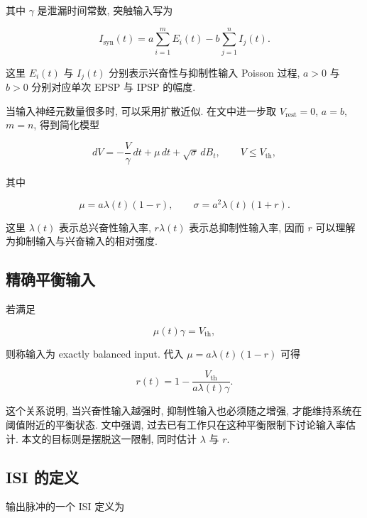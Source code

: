 \documentclass[oneside]{ctexart}
\begin{document}
其中 $\gamma$ 是泄漏时间常数, 突触输入写为

\begin{equation}
    I_{\mathrm{syn}}(t)=a\sum\limits_{i=1}^{m}E_i(t)-b\sum\limits_{j=1}^{n}I_j(t).
\end{equation}

这里 $E_i(t)$ 与 $I_j(t)$ 分别表示兴奋性与抑制性输入 Poisson 过程, $a>0$ 与 $b>0$ 分别对应单次 EPSP 与 IPSP 的幅度.

当输入神经元数量很多时, 可以采用扩散近似. 在文中进一步取 $V_{\mathrm{rest}}=0$, $a=b$, $m=n$, 得到简化模型

\begin{equation}
    dV=-\dfrac{V}{\gamma}\,dt+\mu\,dt+\sqrt{\sigma}\,dB_t, \qquad V\leq V_{\mathrm{th}},
\end{equation}

其中

\begin{equation}
    \mu=a\lambda(t)(1-r), \qquad \sigma=a^2\lambda(t)(1+r).
\end{equation}

这里 $\lambda(t)$ 表示总兴奋性输入率, $r\lambda(t)$ 表示总抑制性输入率, 因而 $r$ 可以理解为抑制输入与兴奋输入的相对强度.

\subsection{精确平衡输入}

若满足

\begin{equation}
    \mu(t)\gamma=V_{\mathrm{th}},
\end{equation}

则称输入为 exactly balanced input. 代入 $\mu=a\lambda(t)(1-r)$ 可得

\begin{equation}
    r(t)=1-\dfrac{V_{\mathrm{th}}}{a\lambda(t)\gamma}.
\end{equation}

这个关系说明, 当兴奋性输入越强时, 抑制性输入也必须随之增强, 才能维持系统在阈值附近的平衡状态. 文中强调, 过去已有工作只在这种平衡限制下讨论输入率估计. 本文的目标则是摆脱这一限制, 同时估计 $\lambda$ 与 $r$.

\subsection{ISI 的定义}

输出脉冲的一个 ISI 定义为
\end{document}
